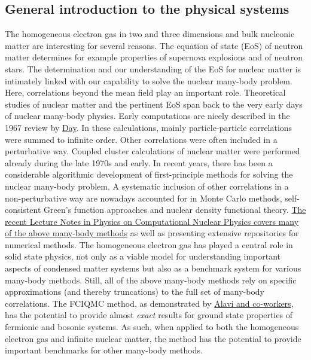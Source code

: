 \documentclass[%
oneside,                 %
final,                   %
10pt]{article}
\begin{document}
\subsection*{General introduction to the  physical systems}

The homogeneous electron gas in two and three dimensions and 
bulk nucleonic matter are interesting for several reasons. The equation of state (EoS) of
neutron matter determines for example properties of supernova
explosions and of neutron
stars.
The determination and our understanding of the EoS for nuclear matter
is intimately linked with our capability to solve the nuclear
many-body problem. Here, correlations beyond the mean field play an
important role.  Theoretical studies of nuclear matter and the
pertinent EoS span back to the very early days of nuclear many-body
physics. Early computations are nicely described in the 1967 review by \href{{https://journals.aps.org/rmp/issues/39/4}}{Day}. 
In these calculations, mainly particle-particle
correlations were summed to infinite order.  Other correlations were
often included in a perturbative way. Coupled cluster calculations of
nuclear matter were performed already during the late 1970s and early. In recent years, there has been a
considerable algorithmic development of first-principle methods for
solving the nuclear many-body problem. A systematic inclusion of other
correlations in a non-perturbative way are nowadays accounted for in
Monte Carlo methods,
self-consistent Green's function approaches and 
nuclear density functional theory. \href{{https://github.com/ManyBodyPhysics/LectureNotesPhysics/blob/master/doc/src/lnp.pdf}}{The recent Lecture Notes in Physics on Computational Nuclear Physics covers many of the above many-body methods} as well as presenting extensive repositories for numerical methods.
The homogeneous electron gas has played a central role in solid state physics, not only as a viable model for understanding important aspects
of condensed matter systems  but also as a benchmark system for various many-body methods.  
Still, all of the above many-body methods rely on specific approximations (and thereby truncations) to the full set of many-body correlations.
The FCIQMC method, as demonstrated by \href{{http://www.nature.com/nature/journal/v493/n7432/full/nature11770.html}}{Alavi and co-workers}, has the potential to provide almost \emph{exact} results for ground state properties of fermionic and bosonic systems. As such, when applied to both the homogeneous electron gas and infinite nuclear matter, the method has the potential to provide important benchmarks for other many-body methods. 
\end{document}

